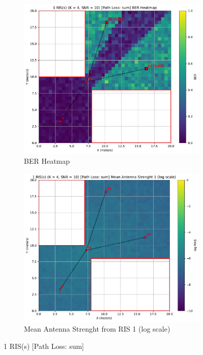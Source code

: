\begin{figure}[H]
  \centering
  \begin{subfigure}[b]{0.48\textwidth}
    \centering
    \includegraphics[width=\textwidth]{imgs/heatmap-simulations/1 RIS(s) (K = 4, SNR = 10) [Path Loss: sum] BER Heatmap.pdf}
    \caption{BER Heatmap}
  \end{subfigure}
  \hfill
  \begin{subfigure}[b]{0.48\textwidth}
    \centering
    \includegraphics[width=\textwidth]{imgs/heatmap-simulations/1 RIS(s) (K = 4, SNR = 10) [Path Loss: sum] Mean Antenna Strenght 1 (log scale).pdf}
    \caption{Mean Antenna Strenght from RIS 1 (log scale)}
  \end{subfigure}
  \caption{1 RIS(s) [Path Loss: sum] }
\end{figure}

